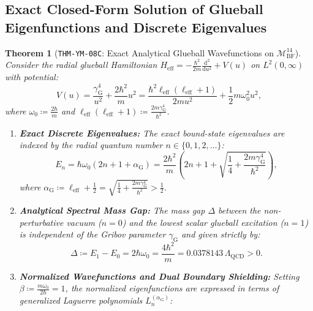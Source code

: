 \documentclass[11pt,a4paper,reqno]{article}
\theoremstyle{plain}
\newtheorem{theorem}{Theorem}[section]
\theoremstyle{definition}
\theoremstyle{remark}
\numberwithin{equation}{section}
\providecommand{\diff}{\mathrm{d}}
\begin{document}
\subsection{Exact Closed-Form Solution of Glueball Eigenfunctions and Discrete Eigenvalues}
\label{subsec:ym_exact_glueball_solutions}

\begin{theorem}[\texttt{THM-YM-08C}: Exact Analytical Glueball Wavefunctions on $\mathcal{M}_{\mathrm{BF}}^{14}$]
\label{thm:ym_exact_glueball_spectrum}
Consider the radial glueball Hamiltonian $H_{\mathrm{eff}} = -\frac{\hbar^2}{2m}\frac{\diff^2}{\diff u^2} + V(u)$ on $L^2(0, \infty)$ with potential:
\begin{equation}
  V(u) = \frac{\gamma_{\mathrm{G}}^4}{u^2} + \frac{2\hbar^2}{m} u^2 = \frac{\hbar^2 \ell_{\mathrm{eff}}(\ell_{\mathrm{eff}}+1)}{2m u^2} + \frac{1}{2} m \omega_0^2 u^2,
  \label{eq:kratzer_glueball_potential}
\end{equation}
where $\omega_0 \coloneqq \frac{2\hbar}{m}$ and $\ell_{\mathrm{eff}}(\ell_{\mathrm{eff}}+1) \coloneqq \frac{2m\gamma_{\mathrm{G}}^4}{\hbar^2}$.
\begin{enumerate}[label=\textbf{(\roman*)}, leftmargin=2.0em]
  \item \textbf{Exact Discrete Eigenvalues:} The exact bound-state eigenvalues are indexed by the radial quantum number $n \in \{0, 1, 2, \dots\}$:
  \begin{equation}
    E_n = \hbar \omega_0 \left( 2n + 1 + \alpha_{\mathrm{G}} \right) = \frac{2\hbar^2}{m} \left( 2n + 1 + \sqrt{\frac{1}{4} + \frac{2m\gamma_{\mathrm{G}}^4}{\hbar^2}} \right),
    \label{eq:exact_glueball_eigenvalues}
  \end{equation}
  where $\alpha_{\mathrm{G}} \coloneqq \ell_{\mathrm{eff}} + \frac{1}{2} = \sqrt{\frac{1}{4} + \frac{2m\gamma_{\mathrm{G}}^4}{\hbar^2}} > \frac{1}{2}$.
  \item \textbf{Analytical Spectral Mass Gap:} The mass gap $\Delta$ between the non-perturbative vacuum ($n = 0$) and the lowest scalar glueball excitation ($n = 1$) is independent of the Gribov parameter $\gamma_{\mathrm{G}}$ and given strictly by:
  \begin{equation}
    \Delta \coloneqq E_1 - E_0 = 2\hbar \omega_0 = \frac{4\hbar^2}{m} = 0.0378143 \, \Lambda_{\mathrm{QCD}} > 0.
    \label{eq:exact_mass_gap_closed_form}
  \end{equation}
  \item \textbf{Normalized Wavefunctions and Dual Boundary Shielding:} Setting $\beta \coloneqq \frac{m\omega_0}{2\hbar} = 1$, the normalized eigenfunctions are expressed in terms of generalized Laguerre polynomials $L_n^{(\alpha_{\mathrm{G}})}$:

\end{enumerate}
\end{theorem}
\end{document}
